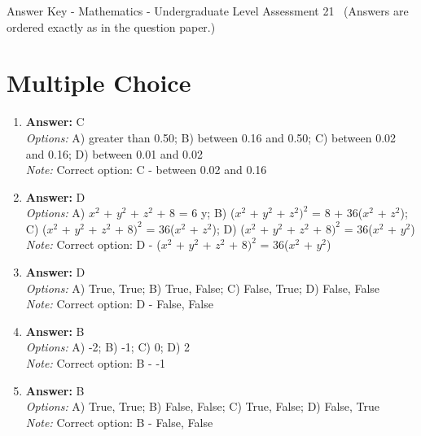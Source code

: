 \documentclass[12pt]{article}
\begin{document}
\begin{center}
Answer Key - Mathematics - Undergraduate Level Assessment 21 \
\small (Answers are ordered exactly as in the question paper.)
\end{center}

\section*{Multiple Choice}
\begin{enumerate}[label=\arabic*.]
\item \textbf{Answer:} C
\\ \textit{Options:} A) greater than 0.50; B) between 0.16 and 0.50; C) between 0.02 and 0.16; D) between 0.01 and 0.02
\\ \textit{Note:} Correct option: C - between 0.02 and 0.16
\item \textbf{Answer:} D
\\ \textit{Options:} A) $x^2$ + $y^2$ + $z^2$ + 8 = 6 y; B) ($x^2$ + $y^2$ + $z^2$$)^2$ = 8 + 36($x^2$ + $z^2$); C) ($x^2$ + $y^2$ + $z^2$ + $8)^2$ = 36($x^2$ + $z^2$); D) ($x^2$ + $y^2$ + $z^2$ + $8)^2$ = 36($x^2$ + $y^2$)
\\ \textit{Note:} Correct option: D - ($x^2$ + $y^2$ + $z^2$ + $8)^2$ = 36($x^2$ + $y^2$)
\item \textbf{Answer:} D
\\ \textit{Options:} A) True, True; B) True, False; C) False, True; D) False, False
\\ \textit{Note:} Correct option: D - False, False
\item \textbf{Answer:} B
\\ \textit{Options:} A) -2; B) -1; C) 0; D) 2
\\ \textit{Note:} Correct option: B - -1
\item \textbf{Answer:} B
\\ \textit{Options:} A) True, True; B) False, False; C) True, False; D) False, True
\\ \textit{Note:} Correct option: B - False, False
\end{enumerate}
\end{document}
